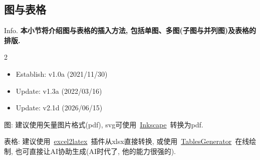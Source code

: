 \subsection{图与表格}
\begin{frame}{Info.}
	\textbf{本小节将介绍图与表格的插入方法, 包括单图、多图(子图与并列图)及表格的排版.}
	\begin{multicols}{2}
		\begin{itemize}
			\item Establish: \textcolor{scugreen}{v1.0a (2021/11/30)}
			\item Update: \textcolor{scugreen}{v1.3a (2022/03/16)}
			\item Update: \textcolor{scugreen}{v2.1d (2026/06/15)}
		\end{itemize}
	\end{multicols}
	图: 建议使用矢量图片格式(pdf), svg可使用~\href{https://inkscape.org/}{\color{scublue}Inkscape}~转换为pdf.\par
	表格: 建议使用~\href{https://www.ctan.org/pkg/excel2latex}{\color{scublue}excel2latex}~插件从xlsx直接转换, 或使用~\href{https://www.tablesgenerator.com/}{\color{scublue}TablesGenerator}~在线绘制, 也可直接让AI协助生成(AI时代了, 他的能力很强的).\par
	\mycopyright
\end{frame}

